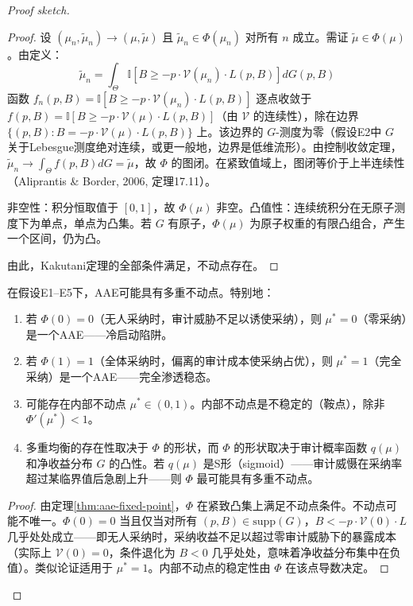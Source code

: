 \documentclass[12pt,a4paper]{ctexart}
\theoremstyle{definition}
\theoremstyle{remark}
\begin{document}
\begin{proof}[Proof sketch]
\begin{proof}
设 $(\mu_n, \tilde{\mu}_n) \to (\mu, \tilde{\mu})$ 且 $\tilde{\mu}_n \in \Phi(\mu_n)$ 对所有 $n$ 成立。需证 $\tilde{\mu} \in \Phi(\mu)$。由定义：
\begin{equation}
\tilde{\mu}_n = \int_{\Theta} \mathbb{I}\left[B \geq -p \cdot \mathcal{V}(\mu_n) \cdot L(p, B)\right] dG(p, B)
\end{equation}
函数 $f_n(p, B) = \mathbb{I}[B \geq -p \cdot \mathcal{V}(\mu_n) \cdot L(p, B)]$ 逐点收敛于 $f(p, B) = \mathbb{I}[B \geq -p \cdot \mathcal{V}(\mu) \cdot L(p, B)]$（由 $\mathcal{V}$ 的连续性），除在边界 $\{(p, B) : B = -p \cdot \mathcal{V}(\mu) \cdot L(p, B)\}$ 上。该边界的 $G$-测度为零（假设E2中 $G$ 关于Lebesgue测度绝对连续，或更一般地，边界是低维流形）。由控制收敛定理，$\tilde{\mu}_n \to \int_{\Theta} f(p, B) dG = \tilde{\mu}$，故 $\Phi$ 的图闭。在紧致值域上，图闭等价于上半连续性（Aliprantis \& Border, 2006, 定理17.11）。

非空性：积分恒取值于 $[0,1]$，故 $\Phi(\mu)$ 非空。凸值性：连续统积分在无原子测度下为单点，单点为凸集。若 $G$ 有原子，$\Phi(\mu)$ 为原子权重的有限凸组合，产生一个区间，仍为凸。

由此，Kakutani定理的全部条件满足，不动点存在。
\end{proof}

\begin{corollary}[多重均衡与临界质量]
\label{cor:multiple-aae}
在假设E1--E5下，AAE可能具有多重不动点。特别地：
\begin{enumerate}[label=(\roman*)]
\item 若 $\Phi(0) = 0$（无人采纳时，审计威胁不足以诱使采纳），则 $\mu^* = 0$（零采纳）是一个AAE——冷启动陷阱。
\item 若 $\Phi(1) = 1$（全体采纳时，偏离的审计成本使采纳占优），则 $\mu^* = 1$（完全采纳）是一个AAE——完全渗透稳态。
\item 可能存在内部不动点 $\mu^* \in (0,1)$。内部不动点是不稳定的（鞍点），除非 $\Phi'(\mu^*) < 1$。
\item 多重均衡的存在性取决于 $\Phi$ 的形状，而 $\Phi$ 的形状取决于审计概率函数 $q(\mu)$ 和净收益分布 $G$ 的凸性。若 $q(\mu)$ 是S形（sigmoid）——审计威慑在采纳率超过某临界值后急剧上升——则 $\Phi$ 最可能具有多重不动点。
\end{enumerate}
\end{corollary}

\begin{proof}
由定理\ref{thm:aae-fixed-point}，$\Phi$ 在紧致凸集上满足不动点条件。不动点可能不唯一。$\Phi(0) = 0$ 当且仅当对所有 $(p, B) \in \text{supp}(G)$，$B < -p \cdot \mathcal{V}(0) \cdot L$ 几乎处处成立——即无人采纳时，采纳收益不足以超过零审计威胁下的暴露成本（实际上 $\mathcal{V}(0) = 0$，条件退化为 $B < 0$ 几乎处处，意味着净收益分布集中在负值）。类似论证适用于 $\mu^* = 1$。内部不动点的稳定性由 $\Phi$ 在该点导数决定。
\end{proof}


\end{proof}
\end{document}
